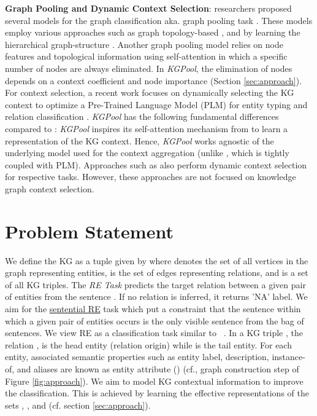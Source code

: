 \documentclass[11pt,a4paper]{article}
\begin{document}
\textbf{Graph Pooling and Dynamic Context Selection}: researchers proposed several models for the graph classification aka. graph pooling task \cite{cangea2018towards,ying2018hierarchical,gao2019graph}. These models employ various approaches such as graph topology-based \cite{rhee2018hybrid}, and by learning the hierarchical graph-structure \cite{ying2018hierarchical}. Another graph pooling model relies on node features and topological information using self-attention \cite{lee2019self} in which a specific number of nodes are always eliminated. In \textit{KGPool}, the elimination of nodes depends on a context coefficient and node importance (Section \ref{sec:approach}). For context selection, a recent work focuses on dynamically selecting the KG context to optimize a Pre-Trained Language Model (PLM) for entity typing and relation classification \cite{su2020contextual}. \textit{KGPool} has the following fundamental differences compared to \cite{su2020contextual}: \textit{KGPool} inspires its self-attention mechanism from \cite{lee2019self,vaswani2017attention} to learn a representation of the KG context. Hence, \textit{KGPool} works agnostic of the underlying model used for the context aggregation (unlike \citet{su2020contextual}, which is tightly coupled with PLM). Approaches such as \cite{liu2017context,DBLP:conf/emnlp/Zhang0M18,DBLP:conf/emnlp/KangZZZ20} also perform dynamic context selection for respective tasks.  However, these approaches are not focused on knowledge graph context selection.
\section{Problem Statement}\label{sec:problem}
We define the KG as a tuple given by  where  denotes the set of all vertices in the graph representing entities,  is the set of edges representing relations, and  is a set of all KG triples. The \textit{RE Task} predicts the target relation  between a given pair of entities  from the sentence .
If no relation is inferred, it returns 'NA' label. We aim for the \underline{sentential RE} task which put a constraint that the sentence within which a given pair of entities occurs is the only visible sentence from the bag of sentences. 
We view RE as a classification task similar to ~\cite{DBLP:conf/emnlp/SorokinG17}. 
In a KG triple , the relation ,  is the head entity (relation origin) while  is the tail entity. For each entity, associated semantic properties such as entity label, description, instance-of, and aliases are known as entity attribute () (cf., graph construction step of Figure \ref{fig:approach}).
We aim to model KG contextual information to improve the classification. This is achieved by learning the effective representations of the sets , , and  (cf. section \ref{sec:approach}).
\end{document}
